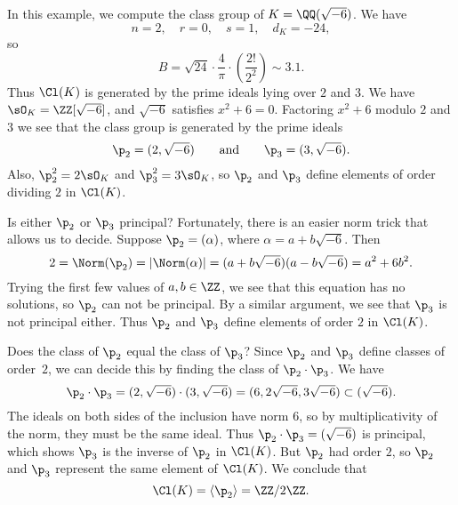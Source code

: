 \begin{example}
	In this example, we compute the class group of $K=\QQ(\sqrt{-6})$.
	We have
	$$
	n = 2, \quad r=0, \quad s=1, \quad d_K = -24,
	$$
	so
	$$
	B = \sqrt{24} \cdot \frac{4}{\pi} \cdot
	\left(\frac{2!}{2^2}\right)\sim 3.1.
	$$
	Thus $\Cl(K)$ is generated by the prime ideals lying over $2$ and $3$.
	We have $\sO_K=\ZZ[\sqrt{-6}]$, and $\sqrt{-6}$ satisfies $x^2+6=0$.
	Factoring $x^2+6$ modulo $2$ and $3$ we see that the class group
	is generated by the prime ideals
	$$
	\p_2 = (2,\sqrt{-6})\qquad\text{and}\qquad
	\p_3 = (3,\sqrt{-6}).
	$$
	Also, $\p_2^2 = 2\sO_K$ and $\p_3^2=3\sO_K$, so
	$\p_2$ and $\p_3$ define elements of order
	dividing $2$ in $\Cl(K)$.

	Is either $\p_2$ or $\p_3$ principal?  Fortunately,
	there is an easier norm trick that allows us to decide.
	Suppose $\p_2 = (\alpha)$, where $\alpha=a+b\sqrt{-6}$.
	Then
	$$
	2 = \Norm(\p_2)
	= \left|\Norm(\alpha)\right|
	= (a+b\sqrt{-6})(a-b\sqrt{-6})
	= a^2 + 6b^2.
	$$
	Trying the first few values of $a, b\in \ZZ$, we see that this
	equation has no solutions, so $\p_2$ can not
	be principal.  By a similar argument, we see that $\p_3$
	is not principal either.  Thus $\p_2$ and $\p_3$ define
	elements of order $2$ in $\Cl(K)$.

	Does the class of $\p_2$ equal the class of $\p_3$?
	Since $\p_2$ and $\p_3$ define classes of order~$2$,
	we can decide this by finding the class of $\p_2\cdot \p_3$.
	We have
	$$
	\p_2\cdot \p_3
	= (2,\sqrt{-6})\cdot (3,\sqrt{-6})
	= (6,2\sqrt{-6}, 3\sqrt{-6}) \subset (\sqrt{-6}).
	$$
	The ideals on both sides of the inclusion have norm $6$,
	so by multiplicativity of the norm, they must be the
	same ideal.  Thus $\p_2\cdot \p_3=(\sqrt{-6})$ is principal,
	which shows $\p_3$ is the inverse of $\p_2$ in $\Cl(K)$. But
	$\p_2$ had order $2$,
	so $\p_2$ and $\p_3$ represent the same element of $\Cl(K)$.
	We conclude that
	$$
	\Cl(K) = \langle \p_2 \rangle = \ZZ/2\ZZ.
	$$
\end{example}
